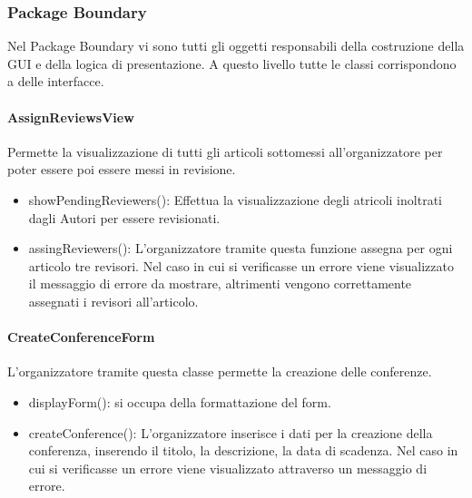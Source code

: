 \subsubsection{Package Boundary}
\label{sec:package_boundary}

Nel Package Boundary vi sono tutti gli oggetti responsabili della costruzione della GUI e della logica di presentazione. A questo livello tutte le classi corrispondono a delle interfacce. 

\paragraph{AssignReviewsView}
Permette la visualizzazione di tutti gli articoli sottomessi all'organizzatore per poter essere poi essere messi in revisione.
\begin{itemize}
\item showPendingReviewers(): Effettua la visualizzazione degli atricoli inoltrati dagli Autori per essere revisionati.\\
\item assingReviewers(): L'organizzatore tramite questa funzione assegna per ogni articolo tre revisori. Nel caso in cui si verificasse un errore viene visualizzato il messaggio di errore da mostrare, altrimenti vengono correttamente assegnati i revisori all'articolo.\\
\end{itemize}


\paragraph{CreateConferenceForm}
L'organizzatore tramite questa classe permette la creazione delle conferenze.\\
\begin{itemize}
\item displayForm(): si occupa della formattazione del form.\\
\item createConference(): L'organizzatore inserisce i dati per la creazione della conferenza, inserendo il titolo, la descrizione, la data di scadenza. Nel caso in cui si verificasse un errore viene visualizzato attraverso un messaggio di errore.
\end{itemize}

